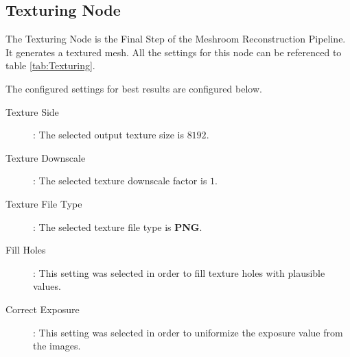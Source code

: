 \documentclass[12pt]{report}
\begin{document}
\subsection*{Texturing Node}
The Texturing Node is the Final Step of the Meshroom Reconstruction Pipeline. It generates a textured mesh. 
All the settings for this node can be referenced to table \ref{tab:Texturing}.

The configured settings for best results are configured below.
\begin{description}
  \item[Texture Side]: The selected output texture size is $8192$.
  \item[Texture Downscale]: The selected texture downscale factor is $1$.
  \item[Texture File Type]: The selected texture file type is \textbf{PNG}.  
  \item[Fill Holes]: This setting was selected in order to fill texture holes with plausible values.
  \item[Correct Exposure]: This setting was selected in order to uniformize the exposure value from the images.  
\end{description}
\end{document}
